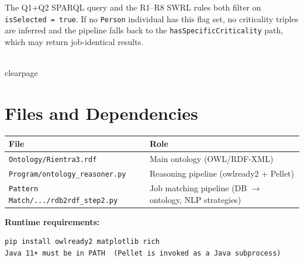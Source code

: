 ﻿\documentclass[12pt,a4paper]{article}
\begin{document}
\vspace{0.5em}

\begin{tcolorbox}[colback=importantbg!60, colframe=green!50!black, title=Important: isSelected Flag Is Mandatory]
The Q1+Q2 SPARQL query and the R1--R8 SWRL rules both filter on \texttt{isSelected = true}. If no \texttt{Person} individual has this flag set, no criticality triples are inferred and the pipeline falls back to the \texttt{hasSpecificCriticality} path, which may return job-identical results.
\end{tcolorbox}

\\clearpage
\section{Files and Dependencies}

\begin{longtable}{@{}ll@{}}
\toprule
\textbf{File} & \textbf{Role} \\
\midrule
\endhead
\texttt{Ontology/Rientra3.rdf} & Main ontology (OWL/RDF-XML) \\
\texttt{Program/ontology\_reasoner.py} & Reasoning pipeline (owlready2 + Pellet) \\
\texttt{Pattern Match/.../rdb2rdf\_step2.py} & Job matching pipeline (DB $\to$ ontology, NLP strategies) \\
\bottomrule
\end{longtable}

\noindent\textbf{Runtime requirements:}
\begin{lstlisting}
pip install owlready2 matplotlib rich
Java 11+ must be in PATH  (Pellet is invoked as a Java subprocess)
\end{lstlisting}
\end{document}
